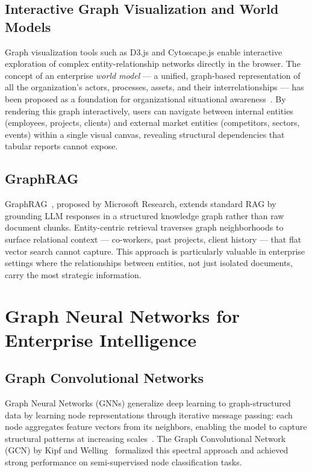 \subsection{Interactive Graph Visualization and World Models}

Graph visualization tools such as D3.js and Cytoscape.js enable interactive
exploration of complex entity-relationship networks directly in the browser.
The concept of an enterprise \textit{world model} — a unified,
graph-based representation of all the organization's actors, processes,
assets, and their interrelationships — has been proposed as a foundation
for organizational situational awareness~\cite{noy2019industry}. By
rendering this graph interactively, users can navigate between internal
entities (employees, projects, clients) and external market entities
(competitors, sectors, events) within a single visual canvas, revealing
structural dependencies that tabular reports cannot expose.

\subsection{GraphRAG}

GraphRAG~\cite{edge2024graphrag}, proposed by Microsoft Research, extends
standard RAG by grounding LLM responses in a structured knowledge graph
rather than raw document chunks. Entity-centric retrieval traverses graph
neighborhoods to surface relational context — co-workers, past projects,
client history — that flat vector search cannot capture. This approach is
particularly valuable in enterprise settings where the relationships between
entities, not just isolated documents, carry the most strategic information.

\section{Graph Neural Networks for Enterprise Intelligence}

\subsection{Graph Convolutional Networks}

Graph Neural Networks (GNNs) generalize deep learning to graph-structured
data by learning node representations through iterative message passing:
each node aggregates feature vectors from its neighbors, enabling the model
to capture structural patterns at increasing scales~\cite{kipf2017gcn}.
The Graph Convolutional Network (GCN) by Kipf and Welling~\cite{kipf2017gcn}
formalized this spectral approach and achieved strong performance on
semi-supervised node classification tasks.

